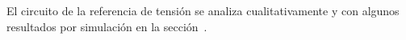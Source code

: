 
\vspace{1.5cm}



El circuito de la referencia de tensión se analiza cualitativamente y con algunos resultados por simulación en la sección~.\\
